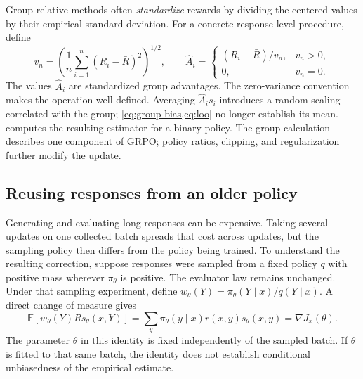 \documentclass[11pt,twoside]{article}
\newcommand{\E}{\mathbb E}
\theoremstyle{definition}
\theoremstyle{remark}
\begin{document}
Group-relative methods often \emph{standardize} rewards by dividing the
centered values by their empirical standard deviation. For a concrete
response-level procedure, define
\[
 v_n=\left(\frac1n\sum_{i=1}^n(R_i-\bar R)^2\right)^{1/2},
 \qquad
 \widehat A_i=\begin{cases}(R_i-\bar R)/v_n,&v_n>0,\\0,&v_n=0.
 \end{cases}
\]
The values $\widehat A_i$ are standardized group advantages.
The zero-variance convention makes the operation well-defined.
Averaging $\widehat A_i s_i$ introduces a random scaling correlated with
the group; \cref{eq:group-bias,eq:loo} no longer establish its mean.
 computes the resulting estimator for a binary
policy. The group calculation describes one component of GRPO; policy
ratios, clipping, and regularization further modify the update.

\subsection{Reusing responses from an older policy}

Generating and evaluating long responses can be expensive. Taking several
updates on one collected batch spreads that cost across updates, but the
sampling policy then differs from the policy being trained.
To understand the resulting correction, suppose
responses were sampled from a fixed policy $q$ with positive mass wherever
$\pi_\theta$ is positive. The evaluator law remains unchanged. Under that
sampling experiment, define
$w_\theta(Y)=\pi_\theta(Y\mid x)/q(Y\mid x)$. A direct change of measure gives
\begin{equation}
 \E[w_\theta(Y)R s_\theta(x,Y)]
 =\sum_y\pi_\theta(y\mid x)r(x,y)s_\theta(x,y)
 =\nabla J_x(\theta).
 \label{eq:importance}
\end{equation}
The parameter $\theta$ in this identity is fixed independently of the
sampled batch. If $\theta$ is fitted to that same batch, the identity does
not establish conditional unbiasedness of the empirical estimate.
\end{document}
